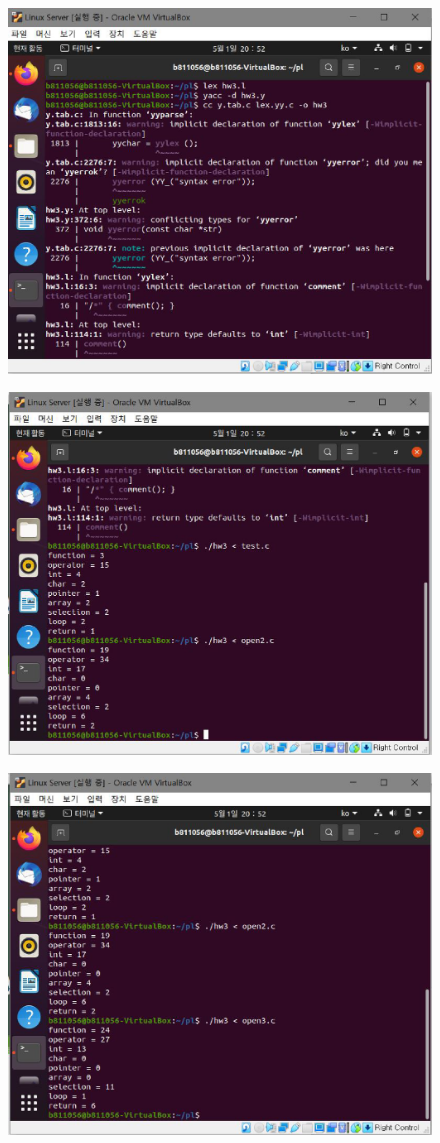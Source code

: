 \documentclass{article}
\begin{document}
\begin{figure}[ht]
\centering
    \includegraphics[width=.8\linewidth]{linux1}  
\end{figure}

\begin{figure}[ht]
\centering
   \includegraphics[width=.8\linewidth]{linux2}
\end{figure}

\begin{figure}[ht]
\centering
   \includegraphics[width=.8\linewidth]{linux3}
\end{figure}
\end{document}
